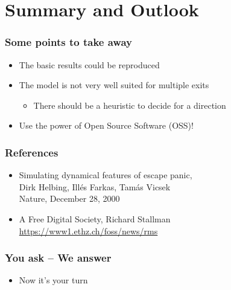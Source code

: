 \documentclass{beamer}
\begin{document}
\section{Summary and Outlook}

\begin{frame}
	\frametitle{Some points to take away}
	\begin{itemize}
		\item The basic results could be reproduced
		\item The model is not very well suited for multiple exits
		\begin{itemize}
			\item There should be a heuristic to decide for a direction
		\end{itemize}
		\item Use the power of Open Source Software (OSS)!
	\end{itemize}
\end{frame}

\begin{frame}
	\frametitle{References}
	\begin{itemize}
		\item Simulating dynamical features of escape panic,\\ 
		Dirk Helbing, Ill\'es Farkas, Tam\'as Vicsek\\
		Nature, December 28, 2000
		\item A Free Digital Society, Richard Stallman \\
			\url{https://www1.ethz.ch/foss/news/rms}
	\end{itemize}
\end{frame}

\begin{frame}
	\frametitle{You ask -- We answer}
	\begin{itemize}
		\item Now it's your turn
	\end{itemize}
\end{frame}
\end{document}
